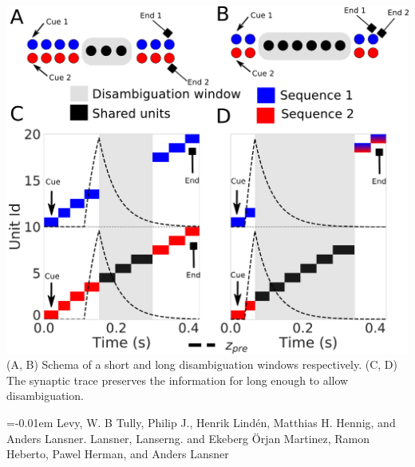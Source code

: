 \documentclass[portrait,a4, final]{baposter}
\begin{document}
\begin{poster}
{\begin{center}
\includegraphics[scale=0.15]{disambiguation_details.pdf}
\smaller (A, B) Schema of a short and long disambiguation windows respectively. (C, D) The synaptic trace preserves the information for long enough to allow disambiguation.  
\end{center}
 
	
}



   {
    \smaller
    \vspace{-0.4em}
    
    \renewcommand{\section}[2]{\vskip 0.05em}
      \begin{thebibliography}{1}\itemsep=-0.01em
      \setlength{\baselineskip}{0.4em}
      \vspace{5pt}
      Levy, W. B 
       Tully, Philip J., Henrik Lind\'en, Matthias H. Hennig, and Anders Lansner. 
      \vspace{5pt}
        Lansner, Lanserng. and Ekeberg {\"O}rjan
      \vspace{5pt}
         Martinez, Ramon Heberto, Pawel Herman, and Anders Lansner
      \end{thebibliography} 
  }



\end{poster}
\end{document}
